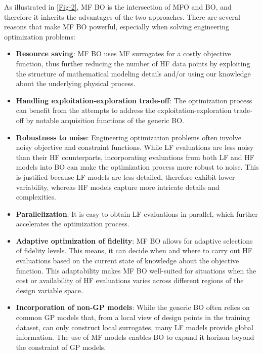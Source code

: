 \documentclass[journal ]{new-aiaa}
\begin{document}
	As illustrated in \cref{Fig-2}, MF BO is the intersection of MFO and BO, and therefore it inherits the advantages of the two approaches.
	There are several reasons that make MF BO powerful, especially when solving engineering optimization problems:
	\begin{itemize}
		\item \textbf{Resource saving}: MF BO uses MF surrogates for a costly objective function, thus further reducing the number of HF data points by exploiting the structure of mathematical modeling details and/or using our knowledge about the underlying physical process.
		
		\item \textbf{Handling exploitation-exploration trade-off}: The optimization process can benefit from the attempts to address the exploitation-exploration trade-off by notable acquisition functions of the generic BO.
		
		\item \textbf{Robustness to noise}: Engineering optimization problems often involve noisy objective and constraint functions.
		While LF evaluations are less noisy than their HF counterparts, incorporating evaluations from both LF and HF models into BO can make the optimization process more robust to noise.
		This is justified because LF models are less detailed, therefore exhibit lower variability, whereas HF models capture more intricate details and complexities.
		
		\item \textbf{Parallelization}: It is easy to obtain LF evaluations in parallel, which further accelerates the optimization process.
		
		\item \textbf{Adaptive optimization of fidelity}: MF BO allows for adaptive selections of fidelity levels.
		This means, it can decide when and where to carry out HF evaluations based on the current state of knowledge about the objective function.
		This adaptability makes MF BO well-suited for situations when the cost or availability of HF evaluations varies across different regions of the design variable space.
		
		\item \textbf{Incorporation of non-GP models}: While the generic BO often relies on common GP models that, from a local view of design points in the training dataset, can only construct local surrogates, many LF models provide global information.
		The use of MF models enables BO to expand it horizon beyond the constraint of GP models.
		
	\end{itemize}
	
\end{document}
